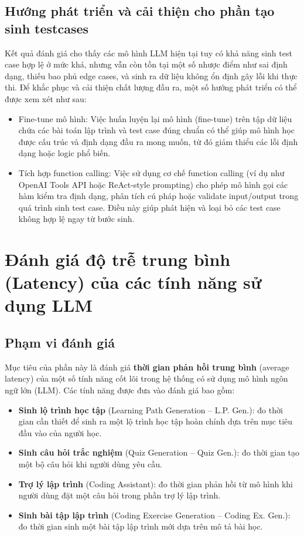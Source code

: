 \subsection{Hướng phát triển và cải thiện cho phần tạo sinh testcases}

Kết quả đánh giá cho thấy các mô hình LLM hiện tại tuy có khả năng sinh test case hợp lệ ở mức khá, nhưng vẫn còn tồn tại một số nhược điểm như sai định dạng, thiếu bao phủ edge cases, và sinh ra dữ liệu không ổn định gây lỗi khi thực thi. Để khắc phục và cải thiện chất lượng đầu ra, một số hướng phát triển có thể được xem xét như sau:

\begin{itemize}
    \item Fine-tune mô hình: Việc huấn luyện lại mô hình (fine-tune) trên tập dữ liệu chứa các bài toán lập trình và test case đúng chuẩn có thể giúp mô hình học được cấu trúc và định dạng đầu ra mong muốn, từ đó giảm thiểu các lỗi định dạng hoặc logic phổ biến.

    \item Tích hợp function calling: Việc sử dụng cơ chế function calling (ví dụ như OpenAI Tools API hoặc ReAct-style prompting) cho phép mô hình gọi các hàm kiểm tra định dạng, phân tích cú pháp hoặc validate input/output trong quá trình sinh test case. Điều này giúp phát hiện và loại bỏ các test case không hợp lệ ngay từ bước sinh.
\end{itemize}

\section{Đánh giá độ trễ trung bình (Latency) của các tính năng sử dụng LLM}

\subsection{Phạm vi đánh giá}

Mục tiêu của phần này là đánh giá \textbf{thời gian phản hồi trung bình} (average latency) của một số tính năng cốt lõi trong hệ thống có sử dụng mô hình ngôn ngữ lớn (LLM). Các tính năng được đưa vào đánh giá bao gồm:

\begin{itemize}
    \item \textbf{Sinh lộ trình học tập} (Learning Path Generation – L.P. Gen.): đo thời gian cần thiết để sinh ra một lộ trình học tập hoàn chỉnh dựa trên mục tiêu đầu vào của người học.
    \item \textbf{Sinh câu hỏi trắc nghiệm} (Quiz Generation – Quiz Gen.): đo thời gian tạo một bộ câu hỏi khi người dùng yêu cầu.
    \item \textbf{Trợ lý lập trình} (Coding Assistant): đo thời gian phản hồi từ mô hình khi người dùng đặt một câu hỏi trong phần trợ lý lập trình.
    \item \textbf{Sinh bài tập lập trình} (Coding Exercise Generation – Coding Ex. Gen.): đo thời gian sinh một bài tập lập trình mới dựa trên mô tả bài học.
\end{itemize}

